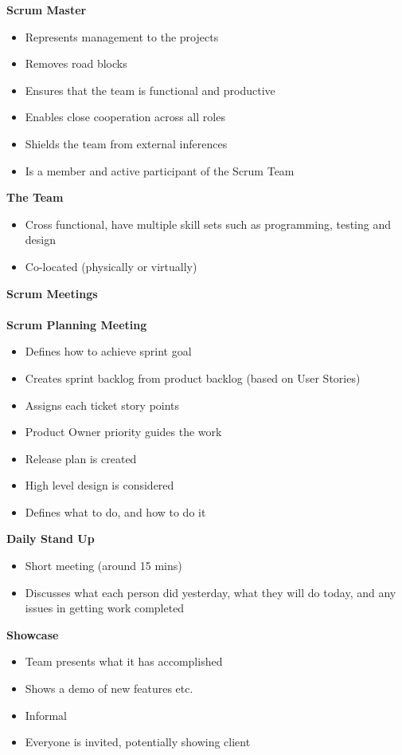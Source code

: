 \documentclass[a4paper,10pt]{article}
\begin{document}
\textbf{Scrum Master}
\begin{itemize}
	\item Represents management to the projects 
	\item Removes road blocks 
	\item Ensures that the team is functional and productive 
	\item Enables close cooperation across all roles 
	\item Shields the team from external inferences 
	\item Is a member and active participant of the Scrum Team
\end{itemize}
\newpage
\textbf{The Team}
\begin{itemize}
	\item Cross functional, have multiple skill sets such as programming, testing and design 
	\item Co-located (physically or virtually)\\
\end{itemize}
\textcolor{BlueGreen}{\textbf{Scrum Meetings}} \\\\
\textbf{Scrum Planning Meeting}
\begin{itemize}
	\item Defines how to achieve sprint goal 
	\item Creates sprint backlog from product backlog (based on User Stories)
	\item Assigns each ticket story points 
	\item Product Owner priority guides the work 
	\item Release plan is created 
	\item High level design is considered
	\item Defines what to do, and how to do it
\end{itemize}
\textbf{Daily Stand Up}
\begin{itemize}
	\item Short meeting (around 15 mins)
	\item Discusses what each person did yesterday, what they will do today, and any issues in getting work completed
\end{itemize}
\textbf{Showcase}
\begin{itemize}
	\item Team presents what it has accomplished 
	\item Shows a demo of new features etc. 
	\item Informal 
	\item Everyone is invited, potentially showing client
\end{itemize}
\end{document}

